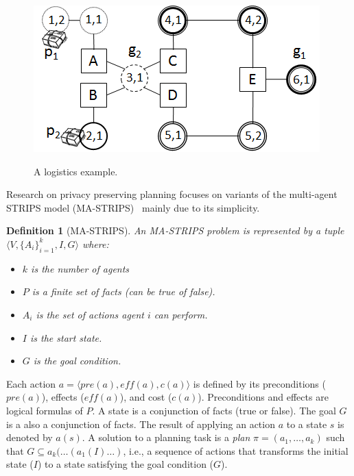 \documentclass[letterpaper]{article}
\newtheorem{definition}{Definition}
\theoremstyle{definition}
\begin{document}
\begin{figure}
\centering
\includegraphics[scale=0.7]{Logistics}
\label{fig:logistics}
\caption{A logistics example.}
\end{figure}


Research on privacy preserving planning focuses on variants of the multi-agent STRIPS model (MA-STRIPS)~\cite{brafman2013complexity} mainly due to its simplicity. 

\begin{definition}[MA-STRIPS]
An MA-STRIPS problem is represented by a tuple $\langle V, \{A_i\}_{i=1}^k, I ,G \rangle$ where:
\begin{itemize}
	\item $k$ is the number of agents
	\item $P$ is a finite set of facts (can be true of false). 
    \item $A_i$ is the set of actions agent $i$ can perform. 
	\item $I$ is the start state.
	\item $G$ is the goal condition.	
\end{itemize} 
\label{def:ma-strips}
\end{definition}
Each action $a=\langle pre(a), eff(a), c(a) \rangle$ is defined by its preconditions ($pre(a)$), effects ($eff(a)$), and cost ($c(a)$). Preconditions and effects are logical formulas of $P$. A state is a conjunction of facts (true or false). The goal $G$ is a also a conjunction of facts. The result of applying an action $a$ to a state $s$ is denoted by $a(s)$. A solution to a planning task is a {\em plan} $\pi=(a_1,\ldots,a_k)$ such that $G\subseteq a_k(\ldots(a_1(I)\ldots)$, i.e., a sequence of actions that transforms the initial state ($I$) to a state satisfying the goal condition ($G$). 
\end{document}

